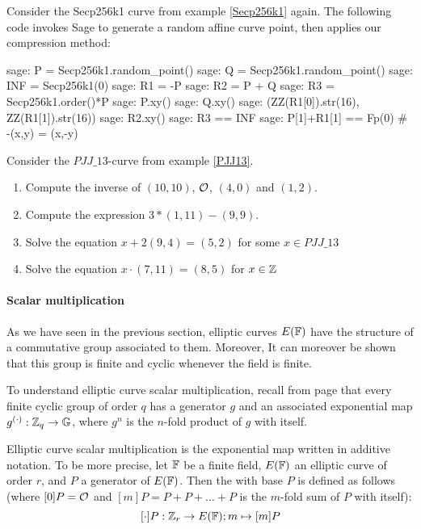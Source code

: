 \begin{example}
Consider the Secp256k1 curve from example \ref{Secp256k1}  again. The following code invokes Sage to generate a random affine curve point, then applies our compression method:
\begin{sagecommandline}
sage: P = Secp256k1.random_point()
sage: Q = Secp256k1.random_point()
sage: INF = Secp256k1(0)
sage: R1 = -P
sage: R2 = P + Q
sage: R3 = Secp256k1.order()*P
sage: P.xy()
sage: Q.xy()
sage: (ZZ(R1[0]).str(16), ZZ(R1[1]).str(16))
sage: R2.xy()
sage: R3 == INF
sage: P[1]+R1[1] == Fp(0) # -(x,y) = (x,-y)
\end{sagecommandline}
\end{example}
\begin{exercise}
Consider the $\mathit{PJJ\_13}$-curve from example \ref{PJJ13}. 
\begin{enumerate}
\item Compute the inverse of $(10,10)$, $\mathcal{O}$, $(4,0)$ and $(1,2)$.
\item Compute the expression $3*(1,11) - (9,9)$.
\item Solve the equation $x + 2(9,4) = (5,2) $ for some $x\in \mathit{PJJ\_13}$
\item Solve the equation $x\cdot (7,11) = (8,5)$ for $x\in \mathbb{Z}$
\end{enumerate}
\end{exercise}
\paragraph{Scalar multiplication}
As we have seen in the previous section, elliptic curves $E(\mathbb{F})$ have the structure of a commutative group associated to them. Moreover, It can moreover be shown that this group is finite and cyclic whenever the field is finite. 

To understand elliptic curve scalar multiplication, recall from page \pageref{cyclic-groups} that every finite cyclic group of order $q$ has a generator $g$ and an associated exponential map $g^{(\cdot)}: \mathbb{Z}_q \to \mathbb{G}$, where $g^n$ is the $n$-fold product of $g$ with itself.  

Elliptic curve scalar multiplication is the exponential map written in additive notation. To be more precise, let $\mathbb{F}$ be a finite field, $E(\mathbb{F})$ an elliptic curve of order $r$, and $P$ a generator of $E(\mathbb{F})$. Then the  with base $P$ is defined as follows (where $[0]P = \mathcal{O}$ and $[m]P = P+P+\ldots + P$ is the $m$-fold sum of $P$ with itself):
$$
[\cdot]P: \mathbb{Z}_r \to E(\mathbb{F}); m \mapsto [m]P
$$

